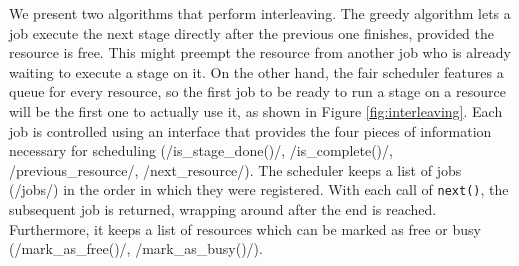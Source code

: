 We present two algorithms that perform interleaving. The greedy algorithm lets a job execute the next stage directly after the previous one finishes, provided the resource is free. This might preempt the resource from another job who is already waiting to execute a stage on it. On the other hand, the fair scheduler features a queue for every resource, so the first job to be ready to run a stage on a resource will be the first one to actually use it, as shown in Figure \ref{fig:interleaving}. Each job is controlled using an interface that provides the four pieces of information necessary for scheduling (\pythoninline/is_stage_done()/, \pythoninline/is_complete()/, \pythoninline/previous_resource/, \pythoninline/next_resource/). The scheduler keeps a list of jobs (\pythoninline/jobs/) in the order in which they were registered. With each call of \texttt{next()}, the subsequent job is returned, wrapping around after the end is reached.  Furthermore, it keeps a list of resources which can be marked as free or busy (\pythoninline/mark_as_free()/, \pythoninline/mark_as_busy()/).
